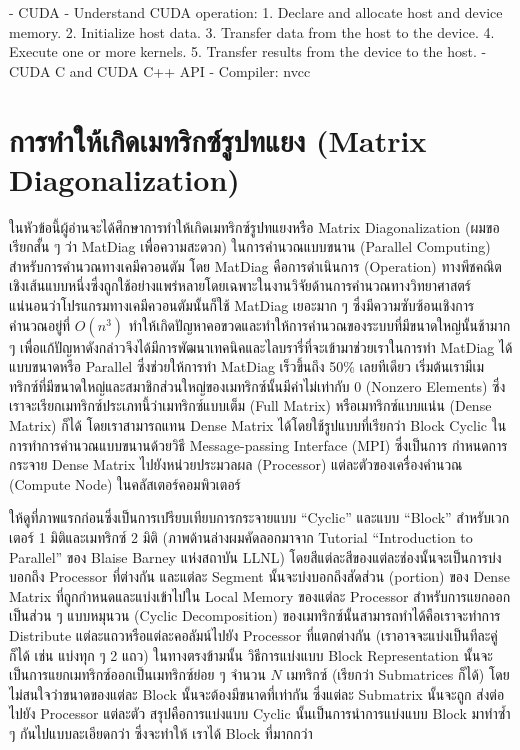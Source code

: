 - CUDA
  - Understand CUDA operation:
    1. Declare and allocate host and device memory.
    2. Initialize host data.
    3. Transfer data from the host to the device.
    4. Execute one or more kernels.
    5. Transfer results from the device to the host.
  - CUDA C and CUDA C++ API
  - Compiler: nvcc

\section{การทำให้เกิดเมทริกซ์รูปทแยง (Matrix Diagonalization)}

ในหัวข้อนี้ผู้อ่านจะได้ศึกษาการทำให้เกิดเมทริกซ์รูปทแยงหรือ Matrix Diagonalization (ผมขอเรียกสั้น ๆ ว่า MatDiag เพื่อความสะดวก) 
ในการคำนวณแบบขนาน (Parallel Computing) สำหรับการคำนวณทางเคมีควอนตัม โดย MatDiag คือการดำเนินการ (Operation) 
ทางพีชคณิตเชิงเส้นแบบหนึ่งซึ่งถูกใช้อย่างแพร่หลายโดยเฉพาะในงานวิจัยด้านการคำนวณทางวิทยาศาสตร์ แน่นอนว่าโปรแกรมทางเคมีควอนตัมนั้นก็ใช้ 
MatDiag เยอะมาก ๆ ซึ่งมีความซับซ้อนเชิงการคำนวณอยู่ที่ $O(n^3)$ ทำให้เกิดปัญหาคอขวดและทำให้การคำนวณของระบบที่มีขนาดใหญ่นั้นช้ามาก ๆ 
เพื่อแก้ปัญหาดังกล่าวจึงได้มีการพัฒนาเทคนิคและไลบรารี่ที่จะเข้ามาช่วยเราในการทำ MatDiag ได้แบบขนาดหรือ Parallel ซึ่งช่วยให้การทำ 
MatDiag เร็วขึ้นถึง 50\% เลยทีเดียว เริ่มต้นเรามีเมทริกซ์ที่มีขนาดใหญ่และสมาชิกส่วนใหญ่ของเมทริกซ์นั้นมีค่าไม่เท่ากับ 0 (Nonzero Elements) 
ซึ่งเราจะเรียกเมทริกซ์ประเภทนี้ว่าเมทริกซ์แบบเต็ม (Full Matrix) หรือเมทริกซ์แบบแน่น (Dense Matrix) ก็ได้ โดยเราสามารถแทน Dense 
Matrix ได้โดยใช้รูปแบบที่เรียกว่า Block Cyclic ในการทำการคำนวณแบบขนานด้วยวิธี Message-passing Interface (MPI) ซึ่งเป็นการ%
กำหนดการกระจาย Dense Matrix ไปยังหน่วยประมวลผล (Processor) แต่ละตัวของเครื่องคำนวณ (Compute Node) ในคลัสเตอร์คอมพิวเตอร์ 



ให้ดูที่ภาพแรกก่อนซึ่งเป็นการเปรียบเทียบการกระจายแบบ \enquote{Cyclic} และแบบ \enquote{Block} สำหรับเวกเตอร์ 1 มิติและเมทริกซ์ 
2 มิติ (ภาพด้านล่างผมคัดลอกมาจาก Tutorial \enquote{Introduction to Parallel} ของ Blaise Barney แห่งสถาบัน LLNL) 
โดยสีแต่ละสีของแต่ละช่องนั้นจะเป็นการบ่งบอกถึง Processor ที่ต่างกัน และแต่ละ Segment นั้นจะบ่งบอกถึงสัดส่วน (portion) ของ Dense 
Matrix ที่ถูกกำหนดและแบ่งเข้าไปใน Local Memory ของแต่ละ Processor สำหรับการแยกออกเป็นส่วน ๆ แบบหมุนวน (Cyclic Decomposition) 
ของเมทริกซ์นั้นสามารถทำได้คือเราจะทำการ Distribute แต่ละแถวหรือแต่ละคอลัมน์ไปยัง Processor ที่แตกต่างกัน (เราอาจจะแบ่งเป็นทีละคู่ก็ได้ 
เช่น แบ่งทุก ๆ 2 แถว) ในทางตรงข้ามนั้น วิธีการแบ่งแบบ Block Representation นั้นจะเป็นการแยกเมทริกซ์ออกเป็นเมทริกซ์ย่อย ๆ จำนวน 
$N$ เมทริกซ์ (เรียกว่า Submatrices ก็ได้) โดยไม่สนใจว่าขนาดของแต่ละ Block นั้นจะต้องมีขนาดที่เท่ากัน ซึ่งแต่ละ Submatrix นั้นจะถูก%
ส่งต่อไปยัง Processor แต่ละตัว สรุปคือการแบ่งแบบ Cyclic นั้นเป็นการนำการแบ่งแบบ Block มาทำซ้ำ ๆ กันไปแบบละเอียดกว่า ซึ่งจะทำให้%
เราได้ Block ที่มากกว่า

